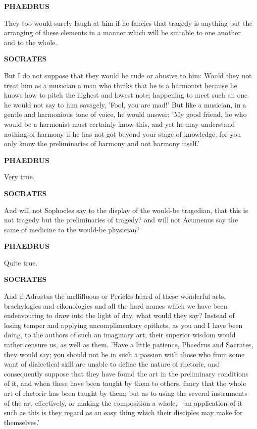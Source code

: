 \documentclass[11pt,letter]{article}
\begin{document}
\par \textbf{PHAEDRUS}
\par   They too would surely laugh at him if he fancies that tragedy is anything but the arranging of these elements in a manner which will be suitable to one another and to the whole.

\par \textbf{SOCRATES}
\par   But I do not suppose that they would be rude or abusive to him:  Would they not treat him as a musician a man who thinks that he is a harmonist because he knows how to pitch the highest and lowest note; happening to meet such an one he would not say to him savagely, 'Fool, you are mad!' But like a musician, in a gentle and harmonious tone of voice, he would answer:  'My good friend, he who would be a harmonist must certainly know this, and yet he may understand nothing of harmony if he has not got beyond your stage of knowledge, for you only know the preliminaries of harmony and not harmony itself.'

\par \textbf{PHAEDRUS}
\par   Very true.

\par \textbf{SOCRATES}
\par   And will not Sophocles say to the display of the would-be tragedian, that this is not tragedy but the preliminaries of tragedy? and will not Acumenus say the same of medicine to the would-be physician?

\par \textbf{PHAEDRUS}
\par   Quite true.

\par \textbf{SOCRATES}
\par   And if Adrastus the mellifluous or Pericles heard of these wonderful arts, brachylogies and eikonologies and all the hard names which we have been endeavouring to draw into the light of day, what would they say? Instead of losing temper and applying uncomplimentary epithets, as you and I have been doing, to the authors of such an imaginary art, their superior wisdom would rather censure us, as well as them. 'Have a little patience, Phaedrus and Socrates, they would say; you should not be in such a passion with those who from some want of dialectical skill are unable to define the nature of rhetoric, and consequently suppose that they have found the art in the preliminary conditions of it, and when these have been taught by them to others, fancy that the whole art of rhetoric has been taught by them; but as to using the several instruments of the art effectively, or making the composition a whole,—an application of it such as this is they regard as an easy thing which their disciples may make for themselves.'
\end{document}
